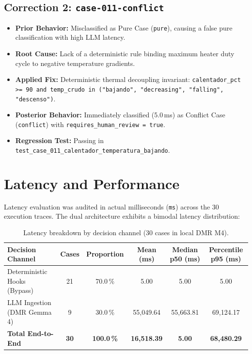 \documentclass[11pt,a4paper]{article}
\begin{document}
\subsection{Correction 2: \texttt{case-011-conflict}}
\begin{itemize}[leftmargin=*]
    \item \textbf{Prior Behavior:} Misclassified as Pure Case (\texttt{pure}), causing a false pure classification with high LLM latency.
    \item \textbf{Root Cause:} Lack of a deterministic rule binding maximum heater duty cycle to negative temperature gradients.
    \item \textbf{Applied Fix:} Deterministic thermal decoupling invariant: \texttt{calentador\_pct >= 90 and temp\_crudo in ("bajando", "decreasing", "falling", "descenso")}.
    \item \textbf{Posterior Behavior:} Immediately classified (5.0\,ms) as Conflict Case (\texttt{conflict}) with \texttt{requires\_human\_review = true}.
    \item \textbf{Regression Test:} Passing in \texttt{test\_case\_011\_calentador\_temperatura\_bajando}.
\end{itemize}

\section{Latency and Performance}
Latency evaluation was audited in actual milliseconds (\texttt{ms}) across the 30 execution traces. The dual architecture exhibits a bimodal latency distribution:

\begin{table}[H]
\centering
\caption{Latency breakdown by decision channel (30 cases in local DMR M4).}
\label{tab:latency_breakdown_en}
\begin{tabular}{lccccc}
\toprule
\textbf{Decision Channel} & \textbf{Cases} & \textbf{Proportion} & \textbf{Mean (ms)} & \textbf{Median p50 (ms)} & \textbf{Percentile p95 (ms)} \\
\midrule
Deterministic Hooks (Bypass) & 21 & 70.0\,\% & 5.00 & 5.00 & 5.00 \\
LLM Ingestion (DMR Gemma 4) & 9 & 30.0\,\% & 55,049.64 & 55,663.81 & 69,124.17 \\
\midrule
\textbf{Total End-to-End} & \textbf{30} & \textbf{100.0\,\%} & \textbf{16,518.39} & \textbf{5.00} & \textbf{68,480.29} \\
\bottomrule
\end{tabular}
\end{table}
\end{document}
